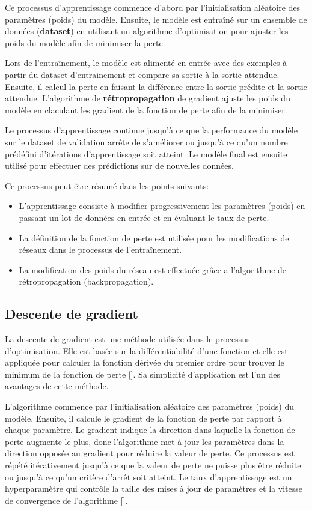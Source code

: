 Ce processus d'apprentissage commence d'abord par l'initialisation aléatoire
des paramètres (poids) du modèle. Ensuite, le modèle est entraîné sur un
ensemble de données (\textbf{dataset}) en utilisant un algorithme
d'optimisation pour ajuster les poids du modèle afin de minimiser la perte.

Lors de l'entraînement, le modèle est alimenté en entrée avec des exemples à
partir du dataset d'entrainement et compare sa sortie à la sortie attendue.
Ensuite, il calcul la perte en faisant la différence entre la sortie prédite et
la sortie attendue. L'algorithme de \textbf{rétropropagation} de gradient
ajuste les poids du modèle en claculant les gradient de la fonction de perte
afin de la minimiser.

Le processus d'apprentissage continue jusqu'à ce que la performance du modèle
sur le dataset de validation arrête de s'améliorer ou jusqu'à ce qu'un nombre
prédéfini d'itérations d'apprentissage soit atteint. Le modèle final est
ensuite utilisé pour effectuer des prédictions sur de nouvelles données.

\medskip
Ce processus peut être résumé dans les points suivants:
\begin{itemize}
	\item L’apprentissage consiste à modifier progressivement les paramètres (poids) en
	      passant un lot de données en entrée et en évaluant le taux de perte.
	\item La définition de la fonction de perte est utilisée pour les modifications de
	      réseaux dans le processus de l'entraînement.
	\item La modification des poids du réseau est effectuée grâce a l’algorithme de
	      rétropropagation (backpropagation).
\end{itemize}

\subsection{Descente de gradient}
La descente de gradient est une méthode utilisée dans le processus
d’optimisation. Elle est basée sur la différentiabilité d’une fonction et elle
est appliquée pour calculer la fonction dérivée du premier ordre pour trouver
le minimum de la fonction de perte [\cite{Goodfellow-et-al-2016}]. Sa
simplicité d’application est l’un des avantages de cette méthode.

L'algorithme commence par l'initialisation aléatoire des paramètres (poids) du
modèle. Ensuite, il calcule le gradient de la fonction de perte par rapport à
chaque paramètre. Le gradient indique la direction dans laquelle la fonction de
perte augmente le plus, donc l'algorithme met à jour les paramètres dans la
direction opposée au gradient pour réduire la valeur de perte. Ce processus est
répété itérativement jusqu'à ce que la valeur de perte ne puisse plus être
réduite ou jusqu'à ce qu'un critère d'arrêt soit atteint. Le taux
d'apprentissage est un hyperparamètre qui contrôle la taille des mises à jour
de paramètres et la vitesse de convergence de l'algorithme
[\cite{Goodfellow-et-al-2016}].

